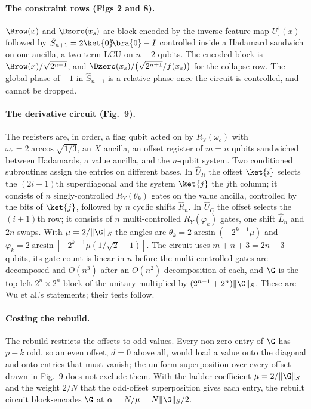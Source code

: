 \paragraph{The constraint rows (Figs 2 and 8).} $\Brow(x)$ and $\Dzero(x_s)$ are block-encoded by the inverse feature map $U_\tau^\dagger(x)$ followed by $\hat S_{n+1} = 2\ket{0}\!\bra{0}-I$ controlled inside a Hadamard sandwich on one ancilla, a two-term LCU on $n+2$ qubits. The encoded block is $\Brow(x)/\sqrt{2^{n+1}}$, and $\Dzero(x_s)/\bigl(\sqrt{2^{n+1}}/f(x_s)\bigr)$ for the collapse row. The global phase of $-1$ in $\hat S_{n+1}$ is a relative phase once the circuit is controlled, and cannot be dropped.

\paragraph{The derivative circuit (Fig.\ 9).} The registers are, in order, a flag qubit acted on by $R_Y(\omega_c)$ with $\omega_c = 2\arccos\sqrt{1/3}$, an $X$ ancilla, an offset register of $m = n$ qubits sandwiched between Hadamards, a value ancilla, and the $n$-qubit system. Two conditioned subroutines assign the entries on different bases. In $\hat U_R$ the offset $\ket{i}$ selects the $(2i+1)$th superdiagonal and the system $\ket{j}$ the $j$th column; it consists of $n$ singly-controlled $R_Y(\theta_k)$ gates on the value ancilla, controlled by the bits of $\ket{j}$, followed by $n$ cyclic shifts $\hat R_n$. In $\hat U_C$ the offset selects the $(i+1)$th row; it consists of $n$ multi-controlled $R_Y(\varphi_k)$ gates, one shift $\hat L_n$ and $2n$ swaps. With $\mu = 2/\|\G\|_S$ the angles are $\theta_k = 2\arcsin(-2^{k-1}\mu)$ and $\varphi_k = 2\arcsin[-2^{k-1}\mu(1/\sqrt2-1)]$. The circuit uses $m+n+3 = 2n+3$ qubits, its gate count is linear in $n$ before the multi-controlled gates are decomposed and $O(n^3)$ after an $O(n^2)$ decomposition of each, and $\G$ is the top-left $2^n\times2^n$ block of the unitary multiplied by $(2^{n-1}+2^n)\|\G\|_S$. These are Wu et al.'s statements; their tests follow.

\paragraph{Costing the rebuild.} The rebuild restricts the offsets to odd values. Every non-zero entry of $\G$ has $p-k$ odd, so an even offset, $d=0$ above all, would load a value onto the diagonal and onto entries that must vanish; the uniform superposition over every offset drawn in Fig.~9 does not exclude them. With the ladder coefficient $\mu=2/\|\G\|_S$ and the weight $2/N$ that the odd-offset superposition gives each entry, the rebuilt circuit block-encodes $\G$ at $\alpha=N/\mu=N\|\G\|_S/2$.


